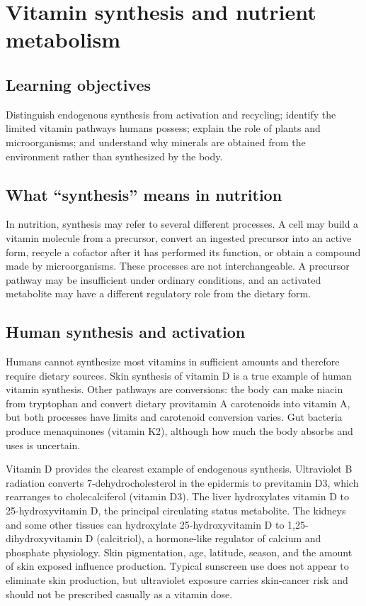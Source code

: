 \chapter{Vitamin synthesis and nutrient metabolism}

\section{Learning objectives}
Distinguish endogenous synthesis from activation and recycling; identify the limited vitamin pathways humans possess; explain the role of plants and microorganisms; and understand why minerals are obtained from the environment rather than synthesized by the body.

\section{What ``synthesis'' means in nutrition}
In nutrition, synthesis may refer to several different processes. A cell may build a vitamin molecule from a precursor, convert an ingested precursor into an active form, recycle a cofactor after it has performed its function, or obtain a compound made by microorganisms. These processes are not interchangeable. A precursor pathway may be insufficient under ordinary conditions, and an activated metabolite may have a different regulatory role from the dietary form.

\section{Human synthesis and activation}
Humans cannot synthesize most vitamins in sufficient amounts and therefore require dietary sources. Skin synthesis of vitamin D is a true example of human vitamin synthesis. Other pathways are conversions: the body can make niacin from tryptophan and convert dietary provitamin A carotenoids into vitamin A, but both processes have limits and carotenoid conversion varies. Gut bacteria produce menaquinones (vitamin K2), although how much the body absorbs and uses is uncertain. \cite{vitaminDMetabolism,niacinDRI,odsA,odsK}

Vitamin D provides the clearest example of endogenous synthesis. Ultraviolet B radiation converts 7-dehydrocholesterol in the epidermis to previtamin D3, which rearranges to cholecalciferol (vitamin D3). The liver hydroxylates vitamin D to 25-hydroxyvitamin D, the principal circulating status metabolite. The kidneys and some other tissues can hydroxylate 25-hydroxyvitamin D to 1,25-dihydroxyvitamin D (calcitriol), a hormone-like regulator of calcium and phosphate physiology. Skin pigmentation, age, latitude, season, and the amount of skin exposed influence production. Typical sunscreen use does not appear to eliminate skin production, but ultraviolet exposure carries skin-cancer risk and should not be prescribed casually as a vitamin dose. \cite{vitaminDMetabolism,odsD}

